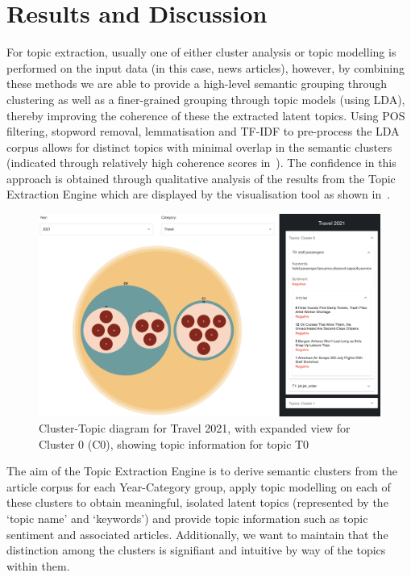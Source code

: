 \section{Results and Discussion}

For topic extraction, usually one of either cluster analysis or topic modelling is performed on the input data (in this case, news articles), however, by combining these methods we are able to provide a high-level semantic grouping through clustering as well as a finer-grained grouping through topic models (using LDA), thereby improving the coherence of these the extracted latent topics. Using POS filtering, stopword removal, lemmatisation and TF-IDF to pre-process the LDA corpus allows for distinct topics with minimal overlap in the semantic clusters (indicated through relatively high coherence scores in~). The confidence in this approach is obtained through qualitative analysis of the results from the Topic Extraction Engine which are displayed by the visualisation tool as shown in~.
\vspace{-1ex}
\begin{figure}[H]
  \centering
  \includegraphics[width=0.93\linewidth]{images/travel2021_topics_cropped.png}
  \caption{Cluster-Topic diagram for Travel 2021, with expanded view for Cluster 0 (C0), showing topic information for topic T0}
  \label{fig:topics_travel2021}
\end{figure}

The aim of the Topic Extraction Engine is to derive semantic clusters from the article corpus for each Year-Category group, apply topic modelling on each of these clusters to obtain meaningful, isolated latent topics (represented by the `topic name' and `keywords') and provide topic information such as topic sentiment and associated articles. Additionally, we want to maintain that the distinction among the clusters is signifiant and intuitive by way of the topics within them.  

